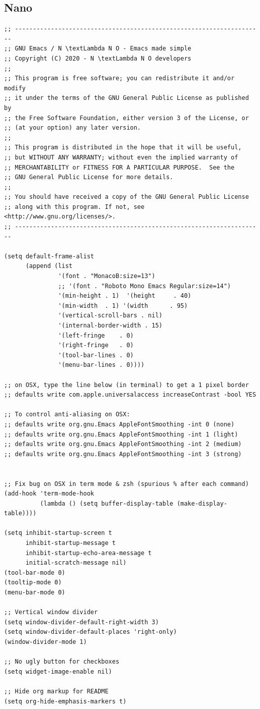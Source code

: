 \documentclass[10pt]{article}
\begin{document}
\subsection{Nano}
\label{sec:org97f26ad}
\begin{verbatim}
;; ---------------------------------------------------------------------
;; GNU Emacs / N \textLambda N O - Emacs made simple
;; Copyright (C) 2020 - N \textLambda N O developers
;;
;; This program is free software; you can redistribute it and/or modify
;; it under the terms of the GNU General Public License as published by
;; the Free Software Foundation, either version 3 of the License, or
;; (at your option) any later version.
;;
;; This program is distributed in the hope that it will be useful,
;; but WITHOUT ANY WARRANTY; without even the implied warranty of
;; MERCHANTABILITY or FITNESS FOR A PARTICULAR PURPOSE.  See the
;; GNU General Public License for more details.
;;
;; You should have received a copy of the GNU General Public License
;; along with this program. If not, see <http://www.gnu.org/licenses/>.
;; ---------------------------------------------------------------------

(setq default-frame-alist
      (append (list
               '(font . "MonacoB:size=13")
               ;; '(font . "Roboto Mono Emacs Regular:size=14")
               '(min-height . 1)  '(height     . 40)
               '(min-width  . 1) '(width      . 95)
               '(vertical-scroll-bars . nil)
               '(internal-border-width . 15)
               '(left-fringe    . 0)
               '(right-fringe   . 0)
               '(tool-bar-lines . 0)
               '(menu-bar-lines . 0))))

;; on OSX, type the line below (in terminal) to get a 1 pixel border
;; defaults write com.apple.universalaccess increaseContrast -bool YES

;; To control anti-aliasing on OSX:
;; defaults write org.gnu.Emacs AppleFontSmoothing -int 0 (none)
;; defaults write org.gnu.Emacs AppleFontSmoothing -int 1 (light)
;; defaults write org.gnu.Emacs AppleFontSmoothing -int 2 (medium)
;; defaults write org.gnu.Emacs AppleFontSmoothing -int 3 (strong)


;; Fix bug on OSX in term mode & zsh (spurious % after each command)
(add-hook 'term-mode-hook
          (lambda () (setq buffer-display-table (make-display-table))))

(setq inhibit-startup-screen t
      inhibit-startup-message t
      inhibit-startup-echo-area-message t
      initial-scratch-message nil)
(tool-bar-mode 0)
(tooltip-mode 0)
(menu-bar-mode 0)

;; Vertical window divider
(setq window-divider-default-right-width 3)
(setq window-divider-default-places 'right-only)
(window-divider-mode 1)

;; No ugly button for checkboxes
(setq widget-image-enable nil)

;; Hide org markup for README
(setq org-hide-emphasis-markers t)
\end{verbatim}
\end{document}
